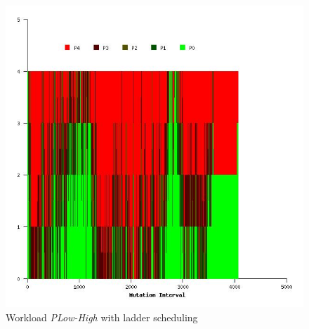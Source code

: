 \begin{figure}
  \begin{center}
    \includegraphics[scale=0.4]{figures/mutation_timeline_figures/mut_t2/PLow-High/125_4.jpeg}%
    \caption{Workload \textit{PLow-High} with ladder scheduling}
    \label{fig:wrk_plowhigh_ladder}
  \end{center}
\end{figure}



